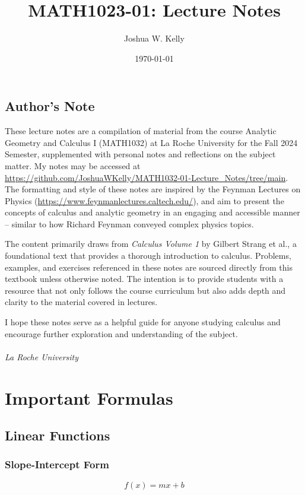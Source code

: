 \documentclass{book}
\title{MATH1023-01: Lecture Notes}
\author{Joshua W. Kelly}
\date{\today}
\begin{document}
\maketitle


\section*{Author's Note}
These lecture notes are a compilation of material from the course Analytic Geometry and Calculus I (MATH1032) at La Roche University for the Fall 2024 Semester, supplemented with personal notes and reflections on the subject matter. My notes may be accessed at \\ \url{https://github.com/JoshuaWKelly/MATH1032-01-Lecture_Notes/tree/main}. The formatting and style of these notes are inspired by the Feynman Lectures on Physics (\url{https://www.feynmanlectures.caltech.edu/}), and aim to present the concepts of calculus and analytic geometry in an engaging and accessible manner -- similar to how Richard Feynman conveyed complex physics topics.

The content primarily draws from \textit{Calculus Volume 1} by Gilbert Strang et al.\cite{strang_calculus_2016}, a foundational text that provides a thorough introduction to calculus. Problems, examples, and exercises referenced in these notes are sourced directly from this textbook unless otherwise noted. The intention is to provide students with a resource that not only follows the course curriculum but also adds depth and clarity to the material covered in lectures.

I hope these notes serve as a helpful guide for anyone studying calculus and encourage further exploration and understanding of the subject.\\

 \\
\textit{La Roche University} \\ 

\tableofcontents

\newpage

\chapter{Important Formulas}
\section{Linear Functions}
\subsection{Slope-Intercept Form}
\begin{equation}
    f(x) = mx + b
\end{equation}
\end{document}
